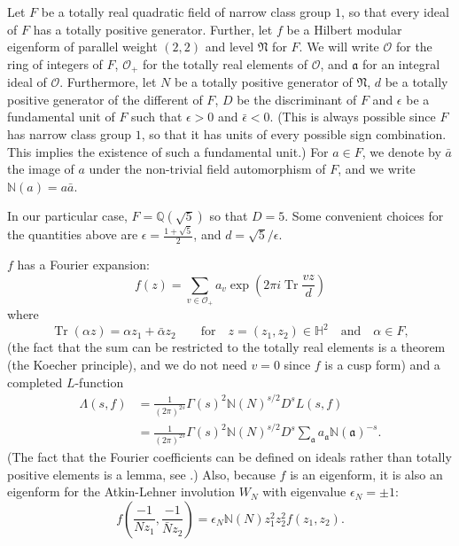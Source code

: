 \documentclass{article}
\DeclareMathOperator{\Tr}{Tr}
\theoremstyle{plain}
\begin{document}
Let $F$ be a totally real quadratic field of narrow class group $1$, so that every ideal of $F$ has a totally positive generator. Further, let $f$ be a Hilbert modular eigenform of parallel weight $(2,2)$ and level $\mathfrak{N}$ for $F$. We will write $\mathcal{O}$ for the ring of integers of $F$, $\mathcal{O}_+$ for the totally real elements of $\mathcal{O}$, and $\mathfrak{a}$ for an integral ideal of $\mathcal{O}$. Furthermore, let $N$ be a totally positive generator of $\mathfrak{N}$, $d$ be a totally positive generator of the different of $F$, $D$ be the discriminant of $F$ and $\epsilon$ be a fundamental unit of $F$ such that $\epsilon>0$ and $\bar{\epsilon}<0$. (This is always possible since $F$ has narrow class group $1$, so that it has units of every possible sign combination. This implies the existence of such a fundamental unit.) For $a \in F$, we denote by $\bar{a}$ the image of $a$ under the non-trivial field automorphism of $F$, and we write $\mathbb{N}(a)=a\bar{a}$. 

In our particular case, $F=\mathbb{Q}(\sqrt{5})$ so that $D=5$. Some convenient choices for the quantities above are $\epsilon=\frac{1+\sqrt{5}}{2}$, and $d=\sqrt{5}/\epsilon$.

$f$ has a Fourier expansion:
\begin{equation*}
f(z)=\sum_{v \in \mathcal{O}_+} a_v \exp\left(2\pi i\Tr \frac{v z}{d}\right)
\end{equation*}
where
\begin{equation*}
\Tr(\alpha z) = \alpha z_1 + \bar{\alpha}z_2 \qquad \text{for} \quad z=(z_1, z_2) \in \mathbb{H}^2 \quad \text{and} \quad \alpha \in F,
\end{equation*}
(the fact that the sum can be restricted to the totally real elements is a theorem (the Koecher principle), and we do not need $v=0$ since $f$ is a cusp form) and a completed $L$-function
\begin{align*}
\Lambda(s,f) & = \frac{1}{(2\pi)^{2s}} \Gamma(s)^2 \mathbb{N}(N)^{s/2} D^s L(s,f)\\
&= \frac{1}{(2\pi)^{2s}} \Gamma(s)^2 \mathbb{N}(N)^{s/2} D^s \sum_{\mathfrak{a}}a_{\mathfrak{a}}\mathbb{N}(\mathfrak{a})^{-s}.
\end{align*}
(The fact that the Fourier coefficients can be defined on ideals rather than totally positive elements is a lemma, see \cite{bump}.)
Also, because $f$ is an eigenform, it is also an eigenform for the Atkin-Lehner involution $W_N$ with eigenvalue $\epsilon_N= \pm 1$:
\begin{equation*}
f\left(\frac{-1}{Nz_1},\frac{-1}{\bar{N}z_2} \right)=\epsilon_N \mathbb{N}(N)z_1^2z_2^2f(z_1, z_2).
\end{equation*}
\end{document}
